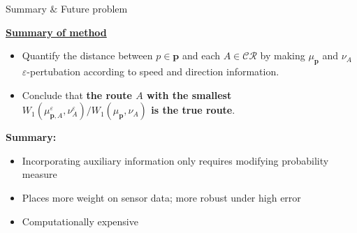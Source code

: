 \documentclass[aspectratio=169, bigfiles, professionalfonts, hyperref={colorlinks=true, allcolors=., urlcolor=blue}]{beamer}
\newcommand{\derr}{\mathsf{d}_{\mathsf{Err}}}
\newcommand{\CR}{\mathcal{CR}}
\newcommand{\R}{\mathbb{R}}
\newcommand{\eps}{\varepsilon} %
\begin{document}
\begin{frame}{Summary $\&$ Future problem}
\begin{tcolorbox}[colframe=black,
colback=black!10!white,
colbacktitle=black!40!white,
coltitle=black, fonttitle=\bfseries]
\textbf{\underline{Summary of method}}\,
\begin{itemize}
\item Quantify the distance between $p\in\mathbf{p}$ and each $A\in\CR$ by making $\mu_\mathbf{p}$ and $\nu_A$ $\eps$-pertubation according to speed and direction information.
\item Conclude that \textbf{the route $A$ with the smallest $W_1(\mu_{\mathbf{p},A}^\eps,\nu_A^\eps)/W_1(\mu_\mathbf{p},\nu_A)$ is the true route}.
\end{itemize}
\end{tcolorbox}
\vspace{1mm}
\begin{tcolorbox}[colframe=yellow,
colback=yellow!10!white,
colbacktitle=yellow!40!white,
coltitle=black, fonttitle=\bfseries]
\textbf{Summary:}
\begin{itemize}
	\item Incorporating auxiliary information only requires modifying probability measure
	\item Places more weight on sensor data; more robust under high error
	\item Computationally expensive
\end{itemize}
\end{tcolorbox}
\end{frame}

\end{document}
